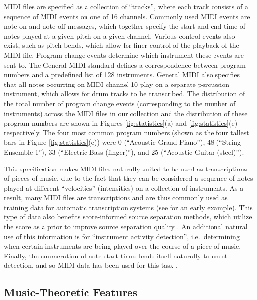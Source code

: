 \documentclass{article}
\begin{document}
MIDI files are specified as a collection of ``tracks'', where each track consists of a sequence of MIDI events on one of 16 channels.
Commonly used MIDI events are note on and note off messages, which together specify the start and end time of notes played at a given pitch on a given channel.
Various control events also exist, such as pitch bends, which allow for finer control of the playback of the MIDI file.
Program change events determine which instrument these events are sent to.
The General MIDI standard defines a correspondence between program numbers and a predefined list of 128 instruments.
General MIDI also specifies that all notes occurring on MIDI channel 10 play on a separate percussion instrument, which allows for drum tracks to be transcribed.
The distribution of the total number of program change events (corresponding to the number of instruments) across the MIDI files in our collection and the distribution of these program numbers are shown in Figures \ref{fig:statistics}(a) and \ref{fig:statistics}(e) respectively.
The four most common program numbers (shown as the four tallest bars in Figure \ref{fig:statistics}(e)) were 0 (``Acoustic Grand Piano''), 48 (``String Ensemble 1''), 33 (``Electric Bass (finger)''), and 25 (``Acoustic Guitar (steel)'').

This specification makes MIDI files naturally suited to be used as transcriptions of pieces of music, due to the fact that they can be considered a sequence of notes played at different ``velocities'' (intensities) on a collection of instruments.
As a result, many MIDI files are transcriptions and are thus commonly used as training data for automatic transcription systems (see \cite{turetsky2003ground} for an early example).
This type of data also benefits score-informed source separation methods, which utilize the score as a prior to improve source separation quality \cite{ewert2014score}.
An additional natural use of this information is for ``instrument activity detection'', i.e.\ determining when certain instruments are being played over the course of a piece of music.
Finally, the enumeration of note start times lends itself naturally to onset detection, and so MIDI data has been used for this task \cite{bello2005tutorial}.

\subsection{Music-Theoretic Features}
\end{document}
